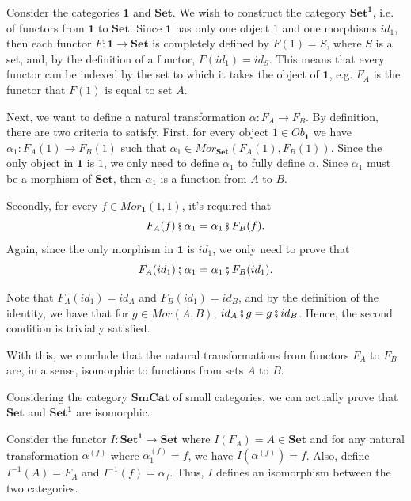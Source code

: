\begin{example}
  Consider the categories $\bm 1$ and $\mathbf{Set}$. We wish to
  construct the category $\mathbf{Set}^{\bm 1}$, i.e. of functors from $\bm 1$
  to $\mathbf{Set}$. Since $\bm 1$ has only one object $1$ and one morphisms $id_1$, then each functor
  $F:\bm 1 \to \mathbf{Set}$ is completely defined by $F(1) = S$, where $S$ is a set, and,
  by the definition of a functor, $F(id_1) = id_S$. This means that every functor
  can be indexed by the set to which it takes the object of $\bm 1$, e.g. $F_A$ is the
  functor that $F(1)$ is equal to set $A$.

  Next, we want to define a natural transformation $\alpha: F_A \to F_B$.
  By definition, there are two criteria to satisfy. First,
  for every object $1 \in Ob_{\bm 1}$ we have
  $\alpha_1:F_A(1) \to F_B(1)$ such that $\alpha_1 \in Mor_{\mathbf{Set}}(F_A(1),F_B(1))$.
  Since the only object in $\bm 1$ is $1$, we only need to define $\alpha_1$ to fully define $\alpha$.
  Since $\alpha_1$ must be a morphism of $\mathbf{Set}$, then $\alpha_1$ is a function
  from $A$ to $B$.

  Secondly, for every $f \in Mor_{\bm 1} (1,1)$, it's required that
  \begin{displaymath}
    F_A(f) \fatsemi \alpha_1 = \alpha_1 \fatsemi F_B(f).
  \end{displaymath}
  Again, since the only morphism in $\bm 1$ is $id_1$, we only need to prove that
  \begin{displaymath}
    F_A(id_1) \fatsemi \alpha_1 = \alpha_1 \fatsemi F_B(id_1).
  \end{displaymath}

  Note that $F_A(id_1) = id_A$ and $F_B(id_1) = id_B$, and by the definition
  of the identity, we have that for $g \in Mor(A,B)$, $id_A \fatsemi g = g \fatsemi id_B$.
  Hence, the second condition is trivially satisfied.

  With this, we conclude that the natural transformations from
  functors $F_A$ to $F_B$ are, in a sense, isomorphic to functions from sets
  $A$ to $B$.
  
  Considering the category $\mathbf{SmCat}$ of small categories, we can actually prove
  that $\mathbf{Set}$ and $\mathbf{Set}^{\bm 1}$ are isomorphic.

  Consider the functor
  $I:\mathbf{Set}^{\bm 1} \to \mathbf{Set}$ where $I(F_A) = A \in \mathbf{Set}$ and
  for any natural transformation $\alpha^{(f)}$ where $\alpha^{(f)}_1 = f$, we have
  $I(\alpha^{(f)}) = f$. Also, define $I^{-1}(A) = F_A$ and
  $I^{-1}(f) = \alpha_f$.
  Thus, $I$ defines an isomorphism between the two categories.

\end{example}

